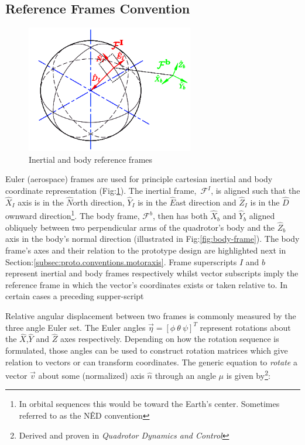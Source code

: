 \subsection{Reference Frames Convention}
\label{subsec:proto.conventions.frames}
\begin{figure}[htbp]
\centering
\includegraphics[width=0.65\textwidth]{figs/reference-frame}
\caption{Inertial and body reference frames}
\label{fig:ref_frame}
\end{figure}
Euler (aerospace) frames are used for principle cartesian inertial and body coordinate representation (Fig:\ref{fig:ref_frame}). The inertial frame,~$\mathcal{F}^I$, is aligned such that the $\hat{X}_I$ axis is in the $\hat{N}$orth direction, $\hat{Y}_I$ is in the $\hat{E}$ast direction and $\hat{Z}_I$ is  in the $\hat{D}$ownward direction\footnote{In orbital sequences this would be toward the Earth's center. Sometimes referred to as the N\^{E}D convention}. The body frame, $\mathcal{F}^b$, then has both $\hat{X}_b$ and $\hat{Y}_b$ aligned obliquely between two perpendicular arms of the quadrotor's body and the $\hat{Z}_b$ axis in the body's normal direction (illustrated in Fig:\ref{fig:body-frame}). The body frame's axes and their relation to the prototype design are highlighted next in Section:\ref{subsec:proto.conventions.motoraxis}. Frame superscripts $I$ and $b$ represent inertial and body frames respectively whilst vector subscripts imply the reference frame in which the vector's coordinates exists or taken relative to. In certain cases a preceding supper-script 
\par
Relative angular displacement between two frames is commonly measured by the three angle Euler set. The Euler angles $\vec{\eta}=[\phi ~\theta ~\psi]^T$ represent rotations about the $\hat{X}$,$\hat{Y}$ and $\hat{Z}$ axes respectively. Depending on how the rotation sequence is formulated, those angles can be used to construct rotation matrices which give relation to vectors or can transform coordinates. The generic equation to \emph{rotate} a vector $\vec{v}$ about some (normalized) axis $\hat{n}$ through an angle $\mu$ is given by\footnote{Derived and proven in \emph{Quadrotor Dynamics and Control}\cite{quaddynamics}}:
